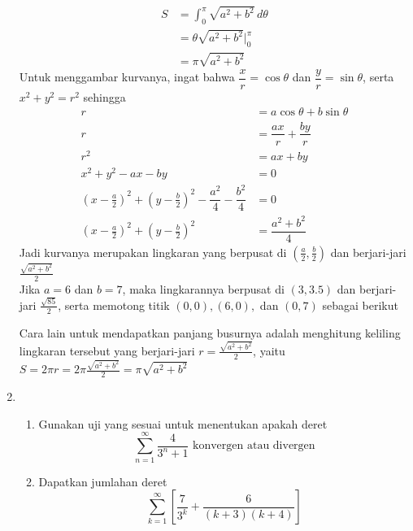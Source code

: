 \documentclass{article}
\begin{document}
\begin{enumerate}
	\begin{align*}
	S &= \int_0^\pi \sqrt{a^2+b^2}\, d\theta\\
	&= \theta\sqrt{a^2+b^2}\big|^\pi_0\\
	&= \pi\sqrt{a^2+b^2} 
	\end{align*}
	Untuk menggambar kurvanya, ingat bahwa $\dfrac{x}{r}=\cos \theta$ dan $\dfrac{y}{r}=\sin \theta$, serta $x^2+y^2=r^2$ sehingga
	\begin{align*}
	r &= a\cos\theta+b\sin\theta\\
	r &= \dfrac{ax}{r}+\dfrac{by}{r}\\
	r^2 &= ax+by\\
	x^2+y^2-ax-by &= 0 \\
	\left(x-\frac{a}{2}\right)^2+\left(y-\frac{b}{2}\right)^2 -\dfrac{a^2}{4}-\dfrac{b^2}{4} &= 0\\
	\left(x-\frac{a}{2}\right)^2+\left(y-\frac{b}{2}\right)^2 &= \dfrac{a^2+b^2}{4}
	\end{align*}
	Jadi kurvanya merupakan lingkaran yang berpusat di $\left(\frac{a}{2},\frac{b}{2}\right)$ dan berjari-jari $\frac{\sqrt{a^2+b^2}}{2}$\\
	Jika $a=6$ dan $b=7$, maka lingkarannya berpusat di $(3,3.5)$ dan berjari-jari $\frac{\sqrt{85}}{2}$, serta memotong titik $(0,0),(6,0),$ dan $(0,7)$ sebagai berikut
	\begin{center}
	\end{center}
	Cara lain untuk mendapatkan panjang busurnya adalah menghitung keliling lingkaran tersebut yang berjari-jari $r=\frac{\sqrt{a^2+b^2}}{2}$, yaitu $S=2\pi r=2\pi\frac{\sqrt{a^2+b^2}}{2}=\pi\sqrt{a^2+b^2}$
	\item \begin{enumerate}
		\item Gunakan uji yang sesuai untuk menentukan apakah deret
	$$ \sum_{n=1}^\infty \dfrac{4}{3^n+1} \text{ konvergen atau divergen} $$
		\item Dapatkan jumlahan deret 
		$$ \sum_{k=1}^\infty \left[\dfrac{7}{3^k}+\dfrac{6}{(k+3)(k+4)}\right] $$
	\end{enumerate}

\end{enumerate}
\end{document}
